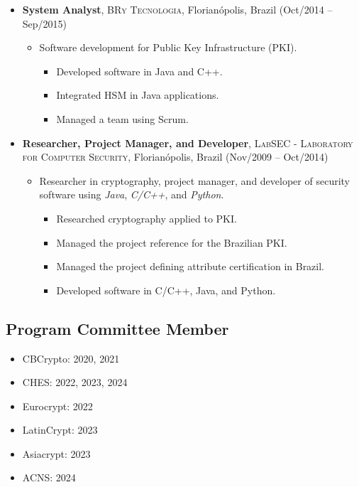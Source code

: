 \documentclass[11pt, a4paper]{article}
\begin{document}
\begin{itemize}
    \item \textbf{System Analyst}, \textsc{BRy Tecnologia}, Florian\'{o}polis, Brazil (Oct/2014 -- Sep/2015)
    \begin{itemize}
        \item Software development for Public Key Infrastructure (PKI).
        \begin{itemize}
            \item Developed software in Java and C++.
            \item Integrated HSM in Java applications.
            \item Managed a team using Scrum.
        \end{itemize}
    \end{itemize}

    \item \textbf{Researcher, Project Manager, and Developer}, \textsc{LabSEC - Laboratory for Computer Security}, Florian\'{o}polis, Brazil (Nov/2009 -- Oct/2014)
    \begin{itemize}
        \item Researcher in cryptography, project manager, and developer of security software using \textit{Java}, \textit{C/C++}, and \textit{Python}.
        \begin{itemize}
            \item Researched cryptography applied to PKI.
            \item Managed the project reference for the Brazilian PKI.
            \item Managed the project defining attribute certification in Brazil.
            \item Developed software in C/C++, Java, and Python.
        \end{itemize}
    \end{itemize}

\end{itemize}

\subsection*{Program Committee Member}
\begin{itemize}
    \item CBCrypto: 2020, 2021
    \item CHES: 2022, 2023, 2024
    \item Eurocrypt: 2022
    \item LatinCrypt: 2023
    \item Asiacrypt: 2023
    \item ACNS: 2024
\end{itemize}
\end{document}
